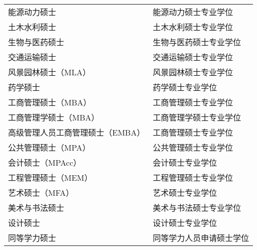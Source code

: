 {\begin{longtable}{ll}
能源动力硕士 & 能源动力硕士专业学位 \\
土木水利硕士 & 土木水利硕士专业学位 \\
生物与医药硕士 & 生物与医药硕士专业学位 \\
交通运输硕士 & 交通运输硕士专业学位 \\
风景园林硕士（MLA） & 风景园林硕士专业学位 \\
药学硕士 & 药学硕士专业学位 \\
工商管理硕士（MBA） & 工商管理硕士专业学位 \\
工商管理学硕士（MBA） & 工商管理学硕士专业学位 \\
高级管理人员工商管理硕士（EMBA） & 工商管理硕士专业学位 \\
公共管理硕士（MPA） & 公共管理硕士专业学位 \\
会计硕士（MPAcc） & 会计硕士专业学位 \\
工程管理硕士（MEM） & 工程管理硕士专业学位 \\
艺术硕士（MFA） & 艺术硕士专业学位 \\
美术与书法硕士 & 美术与书法硕士专业学位 \\
设计硕士 & 设计硕士专业学位 \\
同等学力硕士 & 同等学力人员申请硕士学位 \\
\end{longtable}
}%